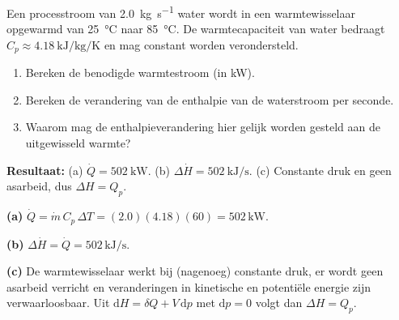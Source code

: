 \begin{oefening}
Een processtroom van \SI{2.0}{\kilogram\per\second} water wordt in een warmtewisselaar opgewarmd van \SI{25}{\celsius} naar \SI{85}{\celsius}. De warmtecapaciteit van water bedraagt $C_p \approx \SI{4.18}{\kilo\joule\per\kilogram\per\kelvin}$ en mag constant worden verondersteld.
\begin{enumerate}
\item[(a)] Bereken de benodigde warmtestroom (in \si{\kilo\watt}).
\item[(b)] Bereken de verandering van de enthalpie van de waterstroom per seconde.
\item[(c)] Waarom mag de enthalpieverandering hier gelijk worden gesteld aan de uitgewisseld warmte?
\end{enumerate}    
\end{oefening}
\begin{oplossing}
\textbf{Resultaat:} (a) $\dot Q = \SI{502}{\kilo\watt}$. (b) $\Delta\dot H = \SI{502}{\kilo\joule\per\second}$. (c) Constante druk en geen asarbeid, dus $\Delta H = Q_p$.

\textbf{(a)} $\dot Q = \dot m\, C_p\, \Delta T = (2.0)(4.18)(60) = 502\,\mathrm{kW}$.

\textbf{(b)} $\Delta \dot H = \dot Q = 502\,\mathrm{kJ/s}$.

\textbf{(c)} De warmtewisselaar werkt bij (nagenoeg) constante druk, er wordt geen asarbeid verricht en veranderingen in kinetische en potenti\"ele energie zijn verwaarloosbaar. Uit $\mathrm{d}H = \delta Q + V\,\mathrm{d}p$ met $\mathrm{d}p = 0$ volgt dan $\Delta H = Q_p$.
\end{oplossing}

